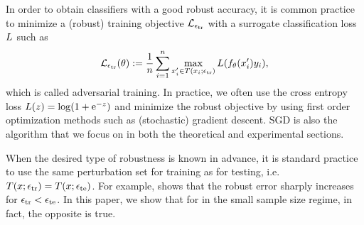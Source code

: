 In order to obtain classifiers with a good robust accuracy, it is
common practice to minimize a (robust) training objective $\mathcal{L}_{\epsilon_{\text{tr}}}$ with a surrogate
classification loss $L$ such as
\begin{equation}
  \label{eq:emploss}
  \mathcal{L}_{\epsilon_{\text{tr}}}(\theta) :=  \frac{1}{n} \sum_{i=1}^n \max_{x_i' \in T({x_i};{\epsilon_{\text{tr}}})} L(f_\theta(x_i') y_i),
\end{equation}
which is called adversarial training.  In practice, we often use the
cross entropy loss $L(z) = \log (1+ \text{e}^{-z})$ and minimize the
robust objective by using first order optimization methods such as
(stochastic) gradient descent.  SGD is also the algorithm that we
focus on in both the theoretical and experimental sections.


When the desired type of robustness is known in advance, it is
standard practice to use the same perturbation set for training as for
testing, i.e. $T({x};{\epsilon_{\text{tr}}})=T({x};{\epsilon_{\text{te}}})$. For example, \citet{madry18} shows that the robust error sharply increases for $\epsilon_{\text{tr}} < \epsilon_{\text{te}}$.
In this paper, we show that for \nameofattacks in the small sample size regime, in fact, the opposite is true.


